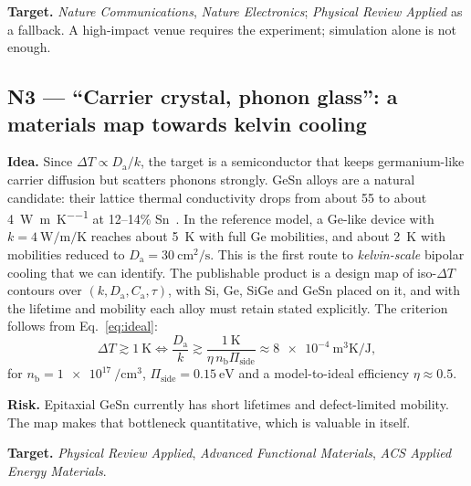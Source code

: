 \documentclass[11pt,a4paper]{article}
\newcommand{\Da}{D_{\mathrm{a}}}
\newcommand{\Ca}{C_{\mathrm{a}}}
\newcommand{\nb}{n_{\mathrm{b}}}
\newcommand{\Pis}{\Pi_{\mathrm{side}}}
\begin{document}
\textbf{Target.} \emph{Nature Communications}, \emph{Nature Electronics}; \emph{Physical Review Applied} as a fallback. A high-impact venue requires the experiment; simulation alone is not enough.

\subsection{N3 --- ``Carrier crystal, phonon glass'': a materials map towards kelvin cooling}
\textbf{Idea.} Since $\Delta T\propto\Da/k$, the target is a semiconductor that keeps germanium-like carrier diffusion but scatters phonons strongly. GeSn alloys are a natural candidate: their lattice thermal conductivity drops from about 55 to about \SI{4}{\watt\per\metre\per\kelvin} at 12--14\% Sn~\cite{spirito2021,concepcion2024}. In the reference model, a Ge-like device with $k=\SI{4}{\watt\per\metre\per\kelvin}$ reaches about \SI{5}{\kelvin} with full Ge mobilities, and about \SI{2}{\kelvin} with mobilities reduced to $\Da=\SI{30}{\centi\metre\squared\per\second}$. This is the first route to \emph{kelvin-scale} bipolar cooling that we can identify. The publishable product is a design map of iso-$\Delta T$ contours over $(k,\Da,\Ca,\tau)$, with Si, Ge, SiGe and GeSn placed on it, and with the lifetime and mobility each alloy must retain stated explicitly. The criterion follows from Eq.~\eqref{eq:ideal}:
\begin{equation}
  \Delta T\gtrsim\SI{1}{\kelvin}\iff\frac{\Da}{k}\gtrsim\frac{\SI{1}{\kelvin}}{\eta\,\nb\Pis}\approx\SI{8e-4}{\metre\cubed\kelvin\per\joule},
\end{equation}
for $\nb=\SI{1e17}{\per\centi\metre\cubed}$, $\Pis=\SI{0.15}{\electronvolt}$ and a model-to-ideal efficiency $\eta\approx0.5$.

\textbf{Risk.} Epitaxial GeSn currently has short lifetimes and defect-limited mobility. The map makes that bottleneck quantitative, which is valuable in itself.

\textbf{Target.} \emph{Physical Review Applied}, \emph{Advanced Functional Materials}, \emph{ACS Applied Energy Materials}.
\end{document}

